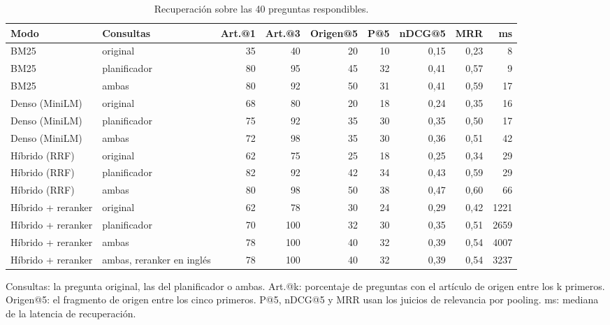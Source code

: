 \begin{table}[htbp]
\centering
\footnotesize
\setlength{\tabcolsep}{3pt}
\caption{Recuperación sobre las 40 preguntas respondibles.}
\label{tab:recuperacion}
\begin{tabular}{llrrrrrrr}
\toprule
\textbf{Modo} & \textbf{Consultas} & \textbf{Art.@1} & \textbf{Art.@3} & \textbf{Origen@5} & \textbf{P@5} & \textbf{nDCG@5} & \textbf{MRR} & \textbf{ms} \\
\midrule
BM25 & original & 35 & 40 & 20 & 10 & 0,15 & 0,23 & 8 \\
BM25 & planificador & 80 & 95 & 45 & 32 & 0,41 & 0,57 & 9 \\
BM25 & ambas & 80 & 92 & 50 & 31 & 0,41 & 0,59 & 17 \\
Denso (MiniLM) & original & 68 & 80 & 20 & 18 & 0,24 & 0,35 & 16 \\
Denso (MiniLM) & planificador & 75 & 92 & 35 & 30 & 0,35 & 0,50 & 17 \\
Denso (MiniLM) & ambas & 72 & 98 & 35 & 30 & 0,36 & 0,51 & 42 \\
Híbrido (RRF) & original & 62 & 75 & 25 & 18 & 0,25 & 0,34 & 29 \\
Híbrido (RRF) & planificador & 82 & 92 & 42 & 34 & 0,43 & 0,59 & 29 \\
Híbrido (RRF) & ambas & 80 & 98 & 50 & 38 & 0,47 & 0,60 & 66 \\
Híbrido + reranker & original & 62 & 78 & 30 & 24 & 0,29 & 0,42 & 1221 \\
Híbrido + reranker & planificador & 70 & 100 & 32 & 30 & 0,35 & 0,51 & 2659 \\
Híbrido + reranker & ambas & 78 & 100 & 40 & 32 & 0,39 & 0,54 & 4007 \\
Híbrido + reranker & ambas, reranker en inglés & 78 & 100 & 40 & 32 & 0,39 & 0,54 & 3237 \\
\bottomrule
\end{tabular}
\par\smallskip\parbox{0.92\linewidth}{\footnotesize Consultas: la pregunta original, las del planificador o ambas. Art.@k: porcentaje de preguntas con el artículo de origen entre los k primeros. Origen@5: el fragmento de origen entre los cinco primeros. P@5, nDCG@5 y MRR usan los juicios de relevancia por pooling. ms: mediana de la latencia de recuperación.}
\end{table}
